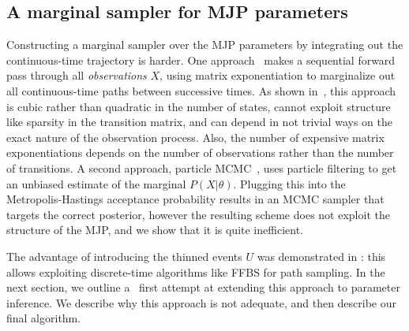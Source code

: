 \subsection{A marginal sampler for MJP parameters} 
Constructing a marginal sampler over the MJP parameters by
integrating out the continuous-time trajectory is harder.
One approach~\citep{FearnSher2006} makes a sequential 
forward pass through all {\em observations} $X$, using matrix exponentiation
to marginalize out all
continuous-time paths between successive times. As
shown in~\cite{RaoTeh13}, this approach is cubic rather than 
quadratic in the 
number of states, cannot exploit structure like sparsity in the 
transition matrix, and can depend in not trivial ways on the exact 
nature of the observation process.
Also, the number of expensive matrix exponentiations depends on
the number of observations rather than the number of transitions.
%
%
A second approach, particle MCMC~\citep{Andrieu10}, uses 
particle filtering to get an unbiased estimate of the marginal 
$P(X|\theta)$. Plugging this into the Metropolis-Hastings 
acceptance probability results in an MCMC sampler that targets the 
correct posterior, however %
the resulting scheme does not exploit the structure 
of the MJP, and we show that it is quite inefficient.

The advantage of introducing the thinned events $U$ was demonstrated in 
\cite{RaoTeh13, RaoTeh12} : this allows exploiting discrete-time 
algorithms like FFBS for path sampling.
In the next section, we outline a \naive\  first attempt at extending this 
approach to 
parameter inference.
We describe why this approach is not adequate, and then describe our
final algorithm. %
